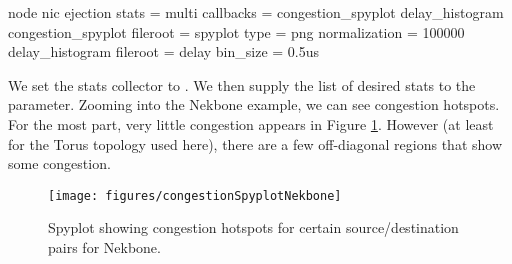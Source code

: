 \begin{ViFile}
node {
 nic {
  ejection {
   stats = multi
   callbacks = congestion_spyplot delay_histogram
   congestion_spyplot {
    fileroot = spyplot
    type = png
    normalization = 100000
   }
   delay_histogram {
    fileroot = delay
    bin_size = 0.5us
   }
  }
 }
}
\end{ViFile}

We set the stats collector to .
We then supply the list of desired stats to the  parameter.
Zooming into the Nekbone example, we can see congestion hotspots.
For the most part, very little congestion appears in Figure \ref{fig:nekboneCongestionSpyplot}.
However (at least for the Torus topology used here),
there are a few off-diagonal regions that show some congestion.

\begin{figure}
\centering
\texttt{[image: figures/congestionSpyplotNekbone]}
\caption{Spyplot showing congestion hotspots for certain source/destination pairs for Nekbone.}
\label{fig:nekboneCongestionSpyplot}
\end{figure}



